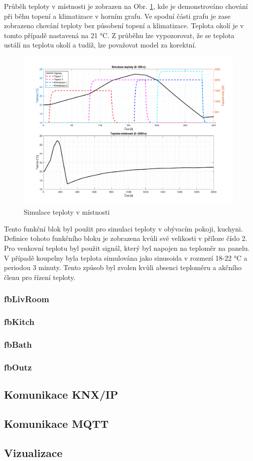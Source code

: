 \noindent Průběh teploty v místnosti je zobrazen na Obr. \ref{fig:simulace_teplota}, kde je demonstrováno chování při běhu topení a klimatizace v horním grafu. Ve spodní části grafu je zase zobrazeno chování teploty bez působení topení a klimatizace. Teplota okolí je v tomto případě nastavená na 21 °C. Z průběhu lze vypozorovat, že se teplota ustálí na teplotu okolí a tudíž, lze považovat model za korektní.
\begin{figure}[!ht]
    \begin{center}
        \includegraphics[scale=0.52]{obrazky/simulace_teploty_kuchyne.pdf}
    \end{center}
    \caption[Simulace teploty v místnosti]{Simulace teploty v místnosti}
    \label{fig:simulace_teplota}
\end{figure}

\noindent Tento funkční blok byl použit pro simulaci teploty v obývacím pokoji, kuchyni. Definice tohoto funkčního bloku je zobrazena kvůli své velikosti v příloze číslo 2. Pro venkovní teplotu byl použit signál, který byl napojen na teploměr na panelu. V případě koupelny byla teplota simulována jako sinusoida v rozmezí 18-22 °C a periodou 3 minuty. Tento způsob byl zvolen kvůli absenci teploměru a akčního členu pro řízení teploty. 

\subsubsection{fbLivRoom}
\subsubsection{fbKitch}
\subsubsection{fbBath}
\subsubsection{fbOutz}

\subsection{Komunikace KNX/IP}
\subsection{Komunikace MQTT}
\subsection{Vizualizace}